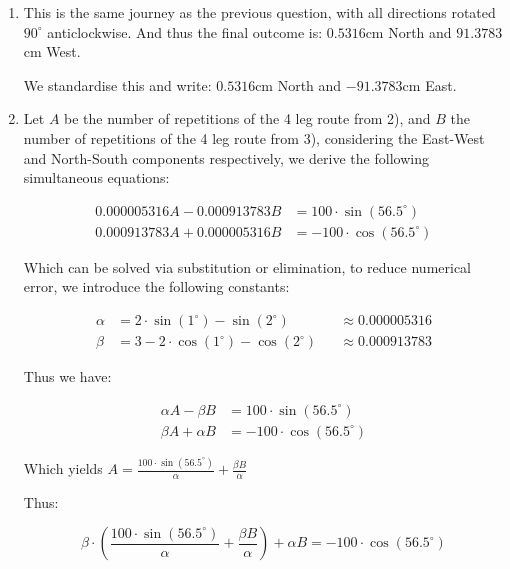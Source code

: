 \documentclass{article}
\begin{document}
\begin{enumerate}
    Which when combined result in a total displacement of:

    $$
    (2\cdot\sin(1^\circ) - \sin(2^\circ), 3-2\cdot \cos(1^\circ) - \cos(2^\circ)) = (0.000005316, 0.000913783)
    $$

    Which is $0.5316$cm East and $91.3783$cm North

    \item This is the same journey as the previous question, with all directions rotated $90^\circ$ anticlockwise. And thus the final outcome is: $0.5316$cm North and $91.3783$cm West. 

    We standardise this and write:
    $0.5316$cm North and $-91.3783$cm East. 

    \item Let $A$ be the number of repetitions of the 4 leg route from 2), and $B$ the number of repetitions of the 4 leg route from 3), considering the East-West and North-South components respectively, we derive the following simultaneous equations:

    \begin{align}
        0.000005316A - 0.000913783B &= 100 \cdot \sin(56.5^\circ) \\
        0.000913783A + 0.000005316B &= - 100 \cdot \cos(56.5^\circ) 
    \end{align}

    Which can be solved via substitution or elimination, to reduce numerical error, we introduce the following constants:

    \begin{align}
        \alpha &= 2\cdot\sin(1^\circ)-\sin(2^\circ) &&\approx 0.000005316\\
        \beta &= 3-2\cdot\cos(1^\circ)-\cos(2^\circ) &&\approx 0.000913783 
    \end{align}

Thus we have:

\begin{align}
    \alpha A - \beta B &= 100\cdot \sin(56.5^\circ) \\
    \beta A + \alpha B &= -100 \cdot \cos(56.5^\circ)
\end{align}

Which yields $A = \frac{100\cdot \sin(56.5^\circ)}{\alpha} +\frac{\beta B}{\alpha}$

Thus:

\begin{equation}
    \beta \cdot \left(\frac{100\cdot \sin(56.5^\circ)}{\alpha} +\frac{\beta B}{\alpha} \right) + \alpha B = -100 \cdot \cos(56.5^\circ)
\end{equation}


\end{enumerate}
\end{document}
